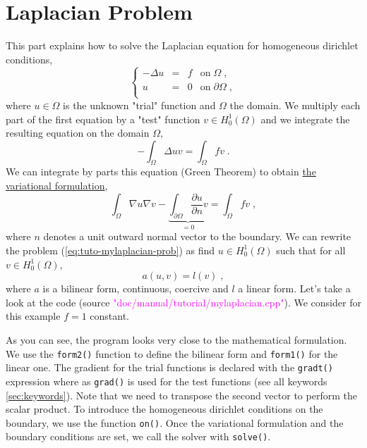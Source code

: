%


\section{Laplacian Problem}
\label{sec:tuto-mylaplacian}

This part explains how to solve the Laplacian equation 
for homogeneous dirichlet conditions,
%
\begin{equation}
\left\{
\begin{array}{rcll}
    -\Delta u & = & f & \text{on}\;\Omega \;, \\
            u & = & 0 & \text{on}\;\partial\Omega \;,\\
\end{array}
\right.
\label{eq:tuto-mylaplacian-prob}
\end{equation}
%
where $u\in\Omega$ is the unknown "trial" function and $\Omega$ the domain.
%
We multiply each part of the first equation by a "test" function $v\in H_0^1(\Omega)$ 
and we integrate the resulting equation on the domain $\Omega$,
%
\begin{equation}
-\int_\Omega \Delta u v = \int_\Omega f v \;.
\end{equation}
%
We can integrate by parts this equation (Green Theorem) to obtain \underline{the variational
formulation},
%
\begin{equation}
\int_\Omega \nabla u \nabla v
-\underbrace{ \int_{\partial\Omega} \frac{\partial u}{\partial n} v }_{= 0}
=\int_\Omega f v \;,
\end{equation}
%
where $n$ denotes a unit outward normal vector to the boundary. We can rewrite the problem
(\ref{eq:tuto-mylaplacian-prob}) as find $u\in H_0^1(\Omega)$ such that for all
$v\in H_0^1(\Omega)$,
%
\begin{equation}
a(u,v)=l(v) \;,
\end{equation}
where $a$ is a bilinear form, continuous, coercive and $l$ a linear form.
Let's take a look at the \feel code
(source \textcolor{magenta}{"doc/manual/tutorial/mylaplacian.cpp"}).
We consider for this example $f=1$ constant.
%
\vspace{2mm}

\vspace{2mm}
%
As you can see, the program looks very close to the mathematical formulation.
We use the \lstinline!form2()! function to define the bilinear form and \lstinline!form1()!
for the linear one. The gradient for the trial functions is declared with the \lstinline!gradt()!
expression where as \lstinline!grad()! is used for the test functions
(see all keywords \ref{sec:keywords}).
Note that we need to transpose the second vector to perform the scalar product.
To introduce the homogeneous dirichlet conditions on the boundary, we use the function
\lstinline!on()!. Once the variational formulation and the boundary conditions are set, we call
the solver with \lstinline!solve()!.






